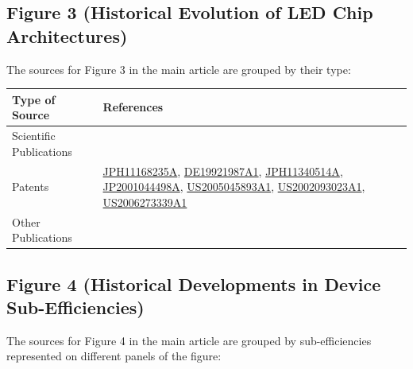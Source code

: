 \documentclass[10pt]{article}
\begin{document}
\subsection{Figure 3 (Historical Evolution of LED Chip Architectures)}

The sources for Figure 3 in the main article are grouped by their type:

\begin{table}[h!]
    \begin{tabularx}{\textwidth}{|l|X|}
    \hline
    \textbf{Type of Source} & \textbf{References} \\
    \hline
    Scientific Publications & \cite{plossl2010wafer}\cite{bierhuizen2007performance}\cite{gencc2019distributed}\cite{chong2014performance} \\
    \hline
    Patents & \href{https://worldwide.espacenet.com/patent/search?q=pn\%3DJPH11168235A}{JPH11168235A}, 
\href{https://worldwide.espacenet.com/patent/search?q=pn\%3DDE19921987A1}{DE19921987A1}, 
\href{https://worldwide.espacenet.com/patent/search?q=pn\%3DJPH11340514A}{JPH11340514A}, 
\href{https://worldwide.espacenet.com/patent/search?q=pn\%3DJP2001044498A}{JP2001044498A}, 
\href{https://worldwide.espacenet.com/patent/search?q=pn\%3DUS2005045893A1}{US2005045893A1}, 
\href{https://worldwide.espacenet.com/patent/search?q=pn\%3DUS2002093023A1}{US2002093023A1}, 
\href{https://worldwide.espacenet.com/patent/search?q=pn\%3DUS2006273339A1}{US2006273339A1}  \\
    \hline
    Other Publications & \cite{craford2015}\cite{sun2016}\cite{yole2013packaging} \\
    \hline
    \end{tabularx}
\end{table}

\subsection{Figure 4 (Historical Developments in Device Sub-Efficiencies)}

The sources for Figure 4 in the main article are grouped by sub-efficiencies represented on different panels of the figure:
\end{document}
